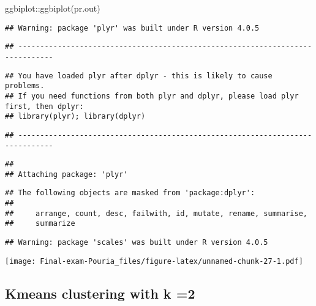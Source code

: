 \documentclass[
]{article}
\newenvironment{Shaded}{\begin{snugshade}}{\end{snugshade}}
\newcommand{\AttributeTok}[1]{\textcolor[rgb]{0.77,0.63,0.00}{#1}}
\newcommand{\CommentTok}[1]{\textcolor[rgb]{0.56,0.35,0.01}{\textit{#1}}}
\newcommand{\DecValTok}[1]{\textcolor[rgb]{0.00,0.00,0.81}{#1}}
\newcommand{\FunctionTok}[1]{\textcolor[rgb]{0.00,0.00,0.00}{#1}}
\newcommand{\NormalTok}[1]{#1}
\newcommand{\OtherTok}[1]{\textcolor[rgb]{0.56,0.35,0.01}{#1}}
\newcommand{\SpecialCharTok}[1]{\textcolor[rgb]{0.00,0.00,0.00}{#1}}
\newcommand{\StringTok}[1]{\textcolor[rgb]{0.31,0.60,0.02}{#1}}
\begin{document}
\begin{Shaded}
\begin{Highlighting}[]
\NormalTok{ggbiplot}\SpecialCharTok{::}\FunctionTok{ggbiplot}\NormalTok{(pr.out)}
\end{Highlighting}
\end{Shaded}

\begin{verbatim}
## Warning: package 'plyr' was built under R version 4.0.5
\end{verbatim}

\begin{verbatim}
## ------------------------------------------------------------------------------
\end{verbatim}

\begin{verbatim}
## You have loaded plyr after dplyr - this is likely to cause problems.
## If you need functions from both plyr and dplyr, please load plyr first, then dplyr:
## library(plyr); library(dplyr)
\end{verbatim}

\begin{verbatim}
## ------------------------------------------------------------------------------
\end{verbatim}

\begin{verbatim}
## 
## Attaching package: 'plyr'
\end{verbatim}

\begin{verbatim}
## The following objects are masked from 'package:dplyr':
## 
##     arrange, count, desc, failwith, id, mutate, rename, summarise,
##     summarize
\end{verbatim}

\begin{verbatim}
## Warning: package 'scales' was built under R version 4.0.5
\end{verbatim}

\texttt{[image: Final-exam-Pouria\_files/figure-latex/unnamed-chunk-27-1.pdf]}

\hypertarget{kmeans-clustering-with-k-2}{%
\subsection{Kmeans clustering with k
=2}\label{kmeans-clustering-with-k-2}}

\begin{Shaded}
\end{Shaded}
\end{document}
